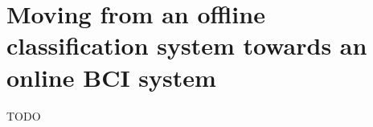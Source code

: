 





\chapter{Moving from an offline classification system towards an online BCI system}
\label{ch:online_bci_system}
TODO
